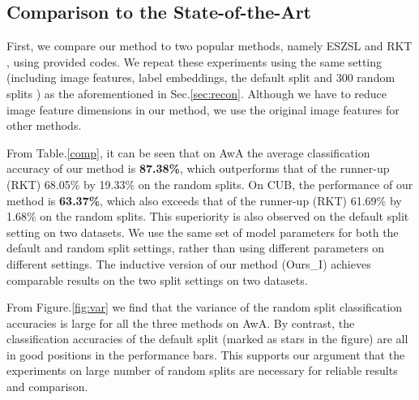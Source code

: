 \documentclass{article}
\begin{document}
\begin{table*}[]
\begin{tabular}{c|c|c|c|c|c}
\end{tabular}
\caption{Evaluate the synthesized virtual signatures with and without the EM optimization algorithm under the 300 random split setting. Syn.-Sig. denotes classification directly using the synthesized virtual signatures. GMM-EM-Diagonal and GMM-EM-Unit are two regularization methods that use diagonal $\bf{\Sigma}_k$ and unit $\bf{\Sigma}_k$ in the EM algorithm to estimate the GMM. Using GMM-EM with unit $\bm{\Sigma}_k$ brings about 17\% and  6\%  improvement on AwA and CUB respectively. On AwA, using GMM-EM with diagonal $\bm{\Sigma}_k$ increases nearly 1\% classification accuracy over the one using the unit $\bm{\Sigma}_k$. The last column shows that if we initialize the GMM component using random datapoints, the classification accuracy is at chance level.}
\label{tab:SigEM}
\end{table*}


\subsection{Comparison to the State-of-the-Art}

First, we compare our method to two popular methods, namely ESZSL \cite{romera2015embarrassingly} and RKT \cite{wang2016relational}, using provided codes. We repeat these experiments using the same setting (including image features, label embeddings, the default split and 300 random splits ) as the aforementioned in Sec.\ref{sec:recon}. Although we have to reduce image feature dimensions in our method, we use the original image features for other methods.

From Table.\ref{comp}, it can be seen that on AwA the average classification accuracy of our method is \textbf{87.38\%}, which outperforms that of the runner-up (RKT) 68.05\% by {19.33\%} on the random splits. On CUB, the performance of our method is \textbf{63.37\%}, which also exceeds that of the runner-up (RKT) 61.69\% by {1.68\%} on the random splits. This superiority is also observed on the default split setting on two datasets. We use the same set of model parameters for both the default and random split settings, rather than using different parameters on different settings. The inductive version of our method (Ours\_I) achieves comparable results on the two split settings on two datasets.

From Figure.\ref{fig:var} we find that the variance of the random split classification accuracies is large for all the three methods on AwA. By contrast, the classification accuracies of the default split (marked as stars in the figure) are all in good positions in the performance bars. This supports our argument that the experiments on large number of random splits are necessary for reliable results and comparison.
\end{document}
